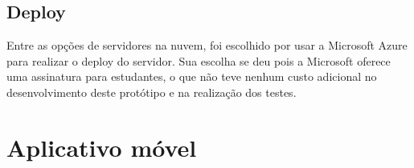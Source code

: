 \subsection{Deploy}
\label{metod:servidor:deploy}
Entre as opções de servidores na nuvem, foi escolhido por usar a Microsoft Azure para realizar o deploy do servidor. Sua escolha se deu pois a Microsoft oferece uma assinatura para estudantes, o que não teve nenhum custo adicional no desenvolvimento deste protótipo e na realização dos testes.

\section{Aplicativo móvel}
\label{metod:app}